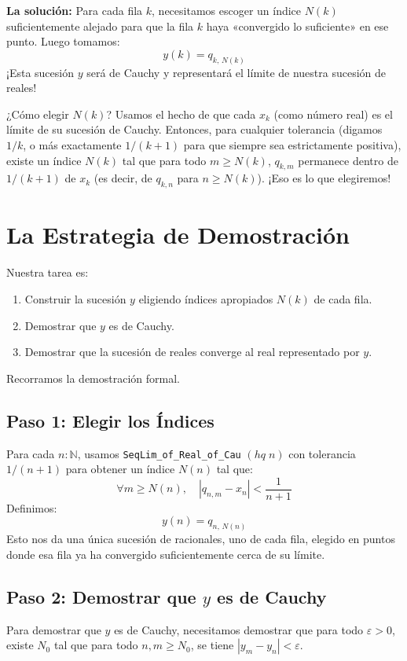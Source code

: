 \textbf{La solución:} Para cada fila $k$, necesitamos escoger un índice $N(k)$
suficientemente alejado para que la fila $k$ haya «convergido lo suficiente» en ese
punto. Luego tomamos:
\[
  y(k) = q_{k,\, N(k)}
\]
¡Esta sucesión $y$ será de Cauchy y representará el límite de nuestra sucesión de
reales!

¿Cómo elegir $N(k)$? Usamos el hecho de que cada $x_k$ (como número real) es el
límite de su sucesión de Cauchy. Entonces, para cualquier tolerancia (digamos
$1/k$, o más exactamente $1/(k+1)$ para que siempre sea estrictamente positiva),
existe un índice $N(k)$ tal que para todo $m \geq N(k)$, $q_{k,m}$ permanece dentro
de $1/(k+1)$ de $x_k$ (es decir, de $q_{k,n}$ para $n \geq N(k)$). ¡Eso es lo que
elegiremos!

\section{La Estrategia de Demostración}

Nuestra tarea es:
\begin{enumerate}
  \item Construir la sucesión $y$ eligiendo índices apropiados $N(k)$ de cada fila.
  \item Demostrar que $y$ es de Cauchy.
  \item Demostrar que la sucesión de reales converge al real representado por $y$.
\end{enumerate}

Recorramos la demostración formal.

\subsection{Paso 1: Elegir los Índices}

Para cada $n : \mathbb{N}$, usamos \texttt{SeqLim\_of\_Real\_of\_Cau}
$(\mathit{hq}\; n)$ con tolerancia $1/(n+1)$ para obtener un índice $N(n)$ tal que:
\[
  \forall m \geq N(n),\quad |q_{n,m} - x_n| < \frac{1}{n+1}
\]
Definimos:
\[
  y(n) = q_{n,\, N(n)}
\]
Esto nos da una única sucesión de racionales, uno de cada fila, elegido en puntos
donde esa fila ya ha convergido suficientemente cerca de su límite.

\subsection{Paso 2: Demostrar que $y$ es de Cauchy}

Para demostrar que $y$ es de Cauchy, necesitamos demostrar que para todo
$\varepsilon > 0$, existe $N_0$ tal que para todo $n, m \geq N_0$, se tiene
$|y_m - y_n| < \varepsilon$.

